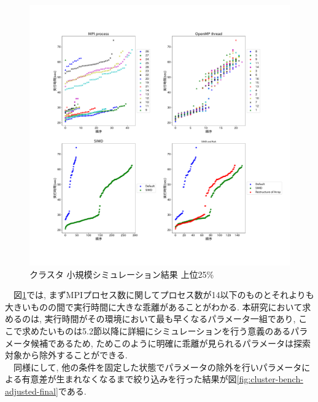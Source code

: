 \begin{figure}[htb]
 \begin{center}
    \includegraphics[width=14cm]{./images/cluster-bench-top25.pdf}
    \caption{クラスタ 小規模シミュレーション結果 上位25\%}
    \label{fig:cluster-bench-top25}
 \end{center}
\end{figure}
　図\ref{fig:cluster-bench-top25}では, まずMPIプロセス数に関してプロセス数が14以下のものとそれよりも大きいものの間で実行時間に大きな乖離があることがわかる.
本研究において求めるのは, 実行時間がその環境において最も早くなるパラメータ一組であり,
ここで求めたいものは5.2節以降に詳細にシミュレーションを行う意義のあるパラメータ候補であるため,
ためこのように明確に乖離が見られるパラメータは探索対象から除外することができる.\\
　同様にして, 他の条件を固定した状態でパラメータの除外を行いパラメータによる有意差が生まれなくなるまで絞り込みを行った結果が図\ref{fig:cluster-bench-adjusted-final}である.\\
